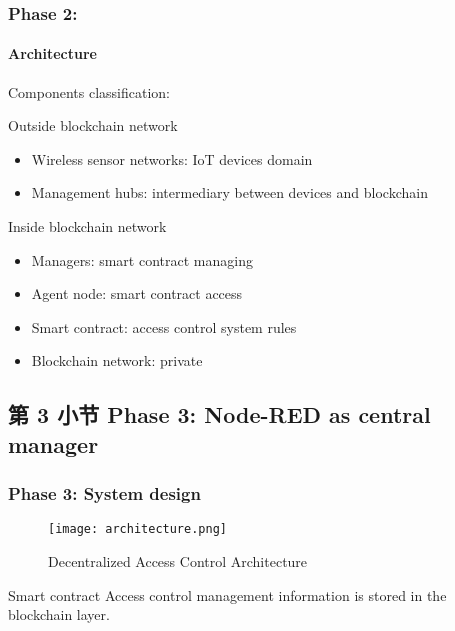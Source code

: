 \documentclass[
    aspectratio=169,                   %
]{beamer}
\begin{document}
    \begin{frame}
        \frametitle{Phase 2: }

        \paragraph{Architecture} Components classification:

        \begin{block}{Outside blockchain network}
            \begin{itemize}
                \item \alert{Wireless sensor networks}: IoT devices domain
                \item \alert{Management hubs}: intermediary between devices and blockchain
            \end{itemize}
        \end{block}

        \begin{block}{Inside blockchain network}
            \begin{itemize}
            \item \alert{Managers}: smart contract managing
            \item \alert{Agent node}: smart contract access
            \item \alert{Smart contract}: access control system rules
            \item \alert{Blockchain network}: private
            \end{itemize}
        \end{block}
    \end{frame}

\subsection{第 3 小节 Phase 3: Node-RED as central manager}

    \begin{frame}
        \frametitle{Phase 3: System design}

            \begin{figure}
                \centering
                \begin{stampbox}
                    \texttt{[image: architecture.png]}
                \end{stampbox}
                \caption{Decentralized Access Control Architecture\cite{novo}}
            \end{figure}

        \begin{block}{Smart contract}
            Access control management information is stored in the blockchain layer.\cite{novo}
        \end{block}
        
    \end{frame}
\end{document}
